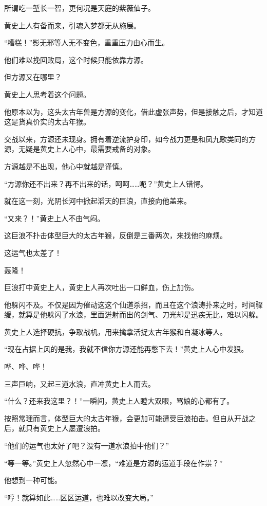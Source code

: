 \begin{this_body}
所谓吃一堑长一智，更何况是天庭的紫薇仙子。

黄史上人有备而来，引魂入梦都无从施展。

“糟糕！”影无邪等人无不变色，重重压力由心而生。

他们难以挽回败局，这个时候只能依靠方源。

但方源又在哪里？

黄史上人思考着这个问题。

他原本以为，这头太古年兽是方源的变化，借此虚张声势，但是接触之后，才知道这是货真价实的太古年猴。

交战以来，方源还未现身。拥有着逆流护身印，如今战力更是和凤九歌类同的方源，无疑是黄史上人心中，最需要戒备的对象。

方源越是不出现，他心中就越是谨慎。

“方源你还不出来？再不出来的话，呵呵……呃？”黄史上人错愕。

就在这一刻，光阴长河中掀起滔天的巨浪，直接向他盖来。

“又来？！”黄史上人不由气闷。

这巨浪不扑击体型巨大的太古年猴，反倒是三番两次，来找他的麻烦。

这运气也太差了！

轰隆！

巨浪打中黄史上人，黄史上人再次吐出一口鲜血，伤上加伤。

他躲闪不及。不仅是因为催动这这个仙道杀招，而且在这个浪涛扑来之时，时间骤缓，就算是他躲闪了水浪，里面迸射而出的剑气、刀光却是迅疾无比，难以闪躲。

黄史上人选择硬抗，争取战机，用来擒拿活捉太古年猴和白凝冰等人。

“现在占据上风的是我，我就不信你方源还能再憋下去！”黄史上人心中发狠。

哗、哗、哗！

三声巨响，又起三道水浪，直冲黄史上人而去。

“什么？还来我这里？！”一瞬间，黄史上人瞪大双眼，骂娘的心都有了。

按照常理而言，体型巨大的太古年猴，会更加可能遭受巨浪拍击。但自从开战之后，就只有黄史上人屡遭浪拍。

“他们的运气也太好了吧？没有一道水浪拍中他们？”

“等一等。”黄史上人忽然心中一凛，“难道是方源的运道手段在作祟？”

他想到一种可能。

“哼！就算如此……区区运道，也难以改变大局。”


\end{this_body}
